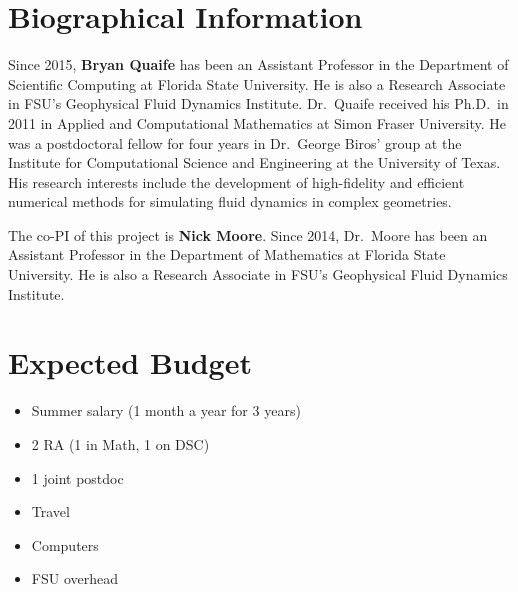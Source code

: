 \documentclass[11pt]{article}
\begin{document}

\section{Biographical Information}
Since 2015, {\bf Bryan Quaife} has been an Assistant Professor in the
Department of Scientific Computing at Florida State University.  He is
also a Research Associate in FSU's Geophysical Fluid Dynamics Institute.
Dr.~Quaife received his Ph.D.~in 2011 in Applied and Computational
Mathematics at Simon Fraser University.  He was a postdoctoral fellow
for four years in Dr.~George Biros' group at the Institute for
Computational Science and Engineering at the University of Texas.  His
research interests include the development of  high-fidelity and
efficient numerical methods for simulating fluid dynamics in complex
geometries.

The co-PI of this project is {\bf Nick Moore}.  Since 2014, Dr.~Moore
has been an Assistant Professor in the Department of Mathematics at
Florida State University.  He is also a Research Associate in FSU's
Geophysical Fluid Dynamics Institute. 


\section{Expected Budget}
\begin{itemize}
  \item Summer salary (1 month a year for 3 years)
  \item 2 RA (1 in Math, 1 on DSC)
  \item 1 joint postdoc
  \item Travel
  \item Computers
  \item FSU overhead
\end{itemize}




\footnotesize{}
\end{document}
